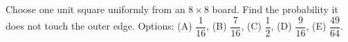 Choose one unit square uniformly from an $8\times8$ board. Find the probability it does not touch the outer edge. Options: (A) $\dfrac{1}{16}$, (B) $\dfrac{7}{16}$, (C) $\dfrac{1}{2}$, (D) $\dfrac{9}{16}$, (E) $\dfrac{49}{64}$.
